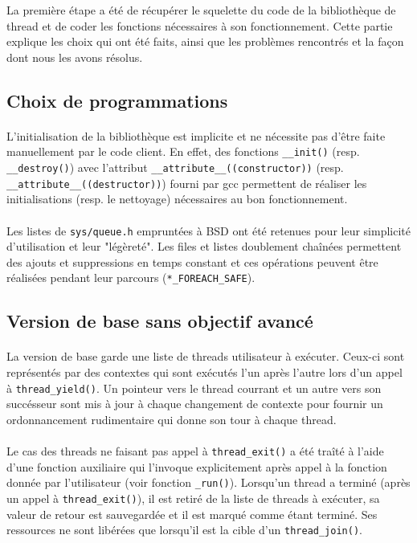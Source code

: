 La première étape a été de récupérer le squelette du code de la bibliothèque de thread et de coder les fonctions nécessaires à son fonctionnement. Cette partie explique les choix qui ont été faits, ainsi que les problèmes rencontrés et la façon dont nous les avons résolus.

\subsection{Choix de programmations}

\paragraph{} L'initialisation de la bibliothèque est implicite et ne nécessite
pas d'être faite manuellement par le code client. En effet, des fonctions
\verb!__init()!  (resp. \verb!__destroy()!) avec l'attribut
\verb!__attribute__((constructor))!  (resp.
\verb!__attribute__((destructor))!) fourni par gcc permettent de réaliser les
initialisations (resp. le nettoyage) nécessaires au bon fonctionnement.

\paragraph{} Les listes de \verb!sys/queue.h! empruntées à BSD ont été
retenues pour leur simplicité d'utilisation et leur "légèreté". Les files et
listes doublement chaînées permettent des ajouts et suppressions en temps
constant et ces opérations peuvent être réalisées pendant leur parcours
(\verb!*_FOREACH_SAFE!).


\subsection{Version de base sans objectif avancé}

\paragraph{} La version de base garde une liste de threads utilisateur à exécuter. Ceux-ci sont représentés par des contextes qui sont exécutés l'un après l'autre lors d'un appel à \verb!thread_yield()!. Un pointeur vers le thread courrant et un autre vers son succésseur sont mis à jour à chaque changement de contexte pour fournir un ordonnancement rudimentaire qui donne son tour à chaque thread.

\paragraph{} Le cas des threads ne faisant pas appel à \verb!thread_exit()! a été traîté à l'aide d'une fonction auxiliaire qui l'invoque explicitement après appel à la fonction donnée par l'utilisateur (voir fonction \verb!_run()!). Lorsqu'un thread a terminé (après un appel à \verb!thread_exit()!), il est retiré de la liste de threads à exécuter, sa valeur de retour est sauvegardée et il est marqué comme étant terminé. Ses ressources ne sont libérées que lorsqu'il est la cible d'un \verb!thread_join()!.


